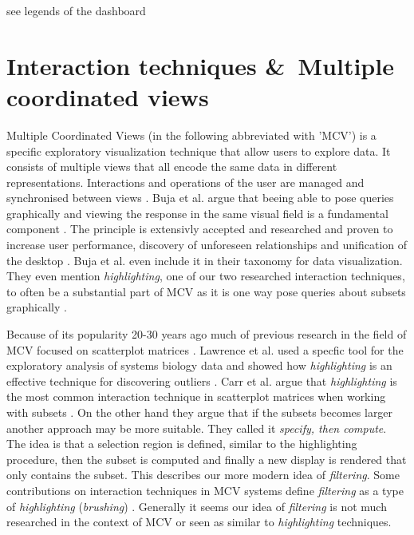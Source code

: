 see legends of the dashboard
\section{Interaction techniques \&\ Multiple coordinated views}
Multiple Coordinated Views (in the following abbreviated with ’MCV’) is a specific exploratory visualization technique that allow users to explore data.
It consists of multiple views that all encode the same data in different representations. Interactions and
operations of the user are managed and synchronised between views \citep*{Roberts.722007722007}. Buja et al. argue that
beeing able to pose queries graphically and viewing the response in the same visual field is a fundamental component
\citep*{Buja.1996}. The principle is extensivly accepted and researched and proven to increase user performance, discovery
of unforeseen relationships and unification of the desktop \citep*{North.1998}. Buja et al. even include it in their taxonomy
for data visualization. They even mention \textit{highlighting}, one of our two researched interaction techniques,
to often be a substantial part of MCV as it is one way pose queries about subsets graphically \citep*{Buja.1996}.

Because of its popularity 20-30 years ago much of previous research in the field of MCV focused on
scatterplot matrices \citep*{Carr.1987, Becker.1987}. Lawrence et al. used a specfic tool for the exploratory analysis of systems biology data
and showed how \textit{highlighting} is an effective technique for discovering outliers \citep*{Lawrence.2006}.
Carr et al. argue that \textit{highlighting} is the most common interaction technique in scatterplot matrices
when working with subsets \citep*{Carr.1987, Becker.1987}. On the other hand they argue that if the subsets becomes larger
another approach may be more suitable. They called it \textit{specify, then compute}.
The idea is that a selection region is defined, similar to the highlighting procedure, then the subset
is computed and finally a new display is rendered that only contains the subset. This describes our more
modern idea of \textit{filtering}. Some contributions on interaction techniques in MCV systems define \textit{filtering} as a type of
\textit{highlighting} (\textit{brushing}) \citep*{Ward.}. Generally it seems our idea of \textit{filtering} is not much researched in the context
of MCV or seen as similar to \textit{highlighting} techniques. 

